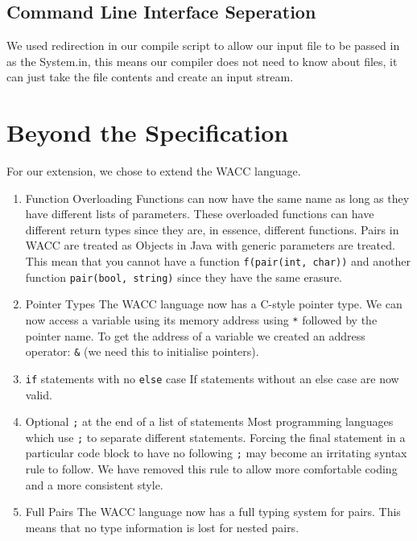\documentclass[11pt,a4paper]{article}
\begin{document}
\subsection{Command Line Interface Seperation}
\label{sub:Command Line Interface Seperation}
We used redirection in our compile script to allow our input file to be passed in as the System.in, this means our compiler does not need to know about files, it can just take the file contents and create an input stream.

\section{Beyond the Specification}
\label{sec:Beyond the Specification}
For our extension, we chose to extend the WACC language. 

\begin{enumerate}
	\item Function Overloading\newline
	Functions can now have the same name as long as they have different lists of parameters. These overloaded functions can have different return types since they are, in essence, different functions. Pairs in WACC are treated as Objects in Java with generic parameters are treated. This mean that you cannot have a function \texttt{f(pair(int, char))} and another function \texttt{pair(bool, string)} since they have the same erasure.
	
	\item Pointer Types\newline
	The WACC language now has a C-style pointer type. We can now access a variable using its memory address using \texttt{*} followed by the pointer name. To get the address of a variable we created an address operator: \texttt{\&} (we need this to initialise pointers).
	
	\item \texttt{if} statements with no \texttt{else} case\newline
	If statements without an else case are now valid.
	
	\item Optional \texttt{;} at the end of a list of statements
	Most programming languages which use \texttt{;} to separate different statements. Forcing the final statement in a particular code block to have no following \texttt{;} may become an irritating syntax rule to follow. We have removed this rule to allow more comfortable coding and a more consistent style.
	
	\item Full Pairs\newline
	The WACC language now has a full typing system for pairs. This means that no type information is lost for nested pairs. 
	
\end{enumerate}
\end{document}

